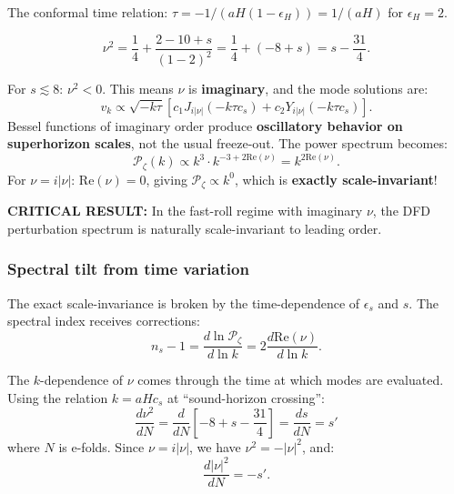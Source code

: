 \documentclass[11pt,a4paper]{article}
\begin{document}
The conformal time relation: $\tau = -1/(aH(1-\epsilon_H)) = 1/(aH)$ for $\epsilon_H = 2$.

\begin{equation}
\nu^2 = \frac{1}{4} + \frac{2 - 10 + s}{(1 - 2)^2} = \frac{1}{4} + (-8+s) = s - \frac{31}{4}.
\end{equation}

For $s \lesssim 8$: $\nu^2 < 0$. This means $\nu$ is \textbf{imaginary}, and the mode solutions are:
\begin{equation}
v_k \propto \sqrt{-k\tau}\left[c_1 J_{i|\nu|}(-k\tau c_s) + c_2 Y_{i|\nu|}(-k\tau c_s)\right].
\end{equation}
Bessel functions of imaginary order produce \textbf{oscillatory behavior on superhorizon scales}, not the usual freeze-out. The power spectrum becomes:
\begin{equation}\label{eq:Ps-fastroll}
\mathcal{P}_\zeta(k) \propto k^3 \cdot k^{-3+2\mathrm{Re}(\nu)} = k^{2\mathrm{Re}(\nu)}.
\end{equation}
For $\nu = i|\nu|$: $\mathrm{Re}(\nu) = 0$, giving $\mathcal{P}_\zeta \propto k^0$, which is \textbf{exactly scale-invariant}!

\textbf{CRITICAL RESULT:} In the fast-roll regime with imaginary $\nu$, the DFD perturbation spectrum is naturally scale-invariant to leading order.

\subsubsection{Spectral tilt from time variation}

The exact scale-invariance is broken by the time-dependence of $\epsilon_s$ and $s$. The spectral index receives corrections:
\begin{equation}\label{eq:ns-fastroll}
n_s - 1 = \frac{d\ln\mathcal{P}_\zeta}{d\ln k} = 2\frac{d\mathrm{Re}(\nu)}{d\ln k}.
\end{equation}

The $k$-dependence of $\nu$ comes through the time at which modes are evaluated. Using the relation $k = aH c_s$ at ``sound-horizon crossing'':
\begin{equation}
\frac{d\nu^2}{dN} = \frac{d}{dN}\left[-8 + s - \frac{31}{4}\right] = \frac{ds}{dN} = s'
\end{equation}
where $N$ is e-folds. Since $\nu = i|\nu|$, we have $\nu^2 = -|\nu|^2$, and:
\begin{equation}
\frac{d|\nu|^2}{dN} = -s'.
\end{equation}
\end{document}
